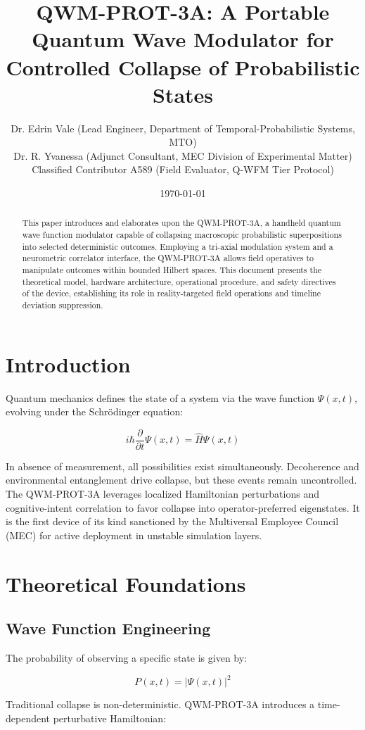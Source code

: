 \documentclass[12pt]{article}
\title{\textbf{QWM-PROT-3A: A Portable Quantum Wave Modulator for Controlled Collapse of Probabilistic States}}
\author{
    Dr. Edrin Vale (Lead Engineer, Department of Temporal-Probabilistic Systems, MTO)\\
    Dr. R. Yvanessa (Adjunct Consultant, MEC Division of Experimental Matter)\\
    Classified Contributor A589 (Field Evaluator, Q-WFM Tier Protocol)
}
\date{\today}
\begin{document}
\maketitle

\begin{abstract}
This paper introduces and elaborates upon the QWM-PROT-3A, a handheld quantum wave function modulator capable of collapsing macroscopic probabilistic superpositions into selected deterministic outcomes. Employing a tri-axial modulation system and a neurometric correlator interface, the QWM-PROT-3A allows field operatives to manipulate outcomes within bounded Hilbert spaces. This document presents the theoretical model, hardware architecture, operational procedure, and safety directives of the device, establishing its role in reality-targeted field operations and timeline deviation suppression.
\end{abstract}

\tableofcontents
\newpage

\section{Introduction}
Quantum mechanics defines the state of a system via the wave function $\Psi(x,t)$, evolving under the Schrödinger equation:

\[
i\hbar \frac{\partial}{\partial t} \Psi(x,t) = \hat{H} \Psi(x,t)
\]

In absence of measurement, all possibilities exist simultaneously. Decoherence and environmental entanglement drive collapse, but these events remain uncontrolled. The QWM-PROT-3A leverages localized Hamiltonian perturbations and cognitive-intent correlation to favor collapse into operator-preferred eigenstates. It is the first device of its kind sanctioned by the Multiversal Employee Council (MEC) for active deployment in unstable simulation layers.

\section{Theoretical Foundations}
\subsection{Wave Function Engineering}
The probability of observing a specific state is given by:

\[
P(x,t) = |\Psi(x,t)|^2
\]

Traditional collapse is non-deterministic. QWM-PROT-3A introduces a time-dependent perturbative Hamiltonian:
\end{document}
